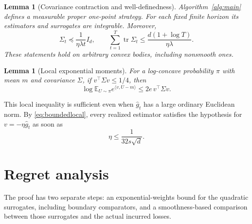 \documentclass[11pt]{article}
\numberwithin{equation}{section}
\newcommand{\E}{\mathbb E}
\newcommand{\tr}{\operatorname{tr}}
\newcommand{\ip}[2]{\langle #1,#2\rangle}
\newtheorem{lemma}[theorem]{Lemma}
\theoremstyle{definition}
\theoremstyle{remark}
\begin{document}
\begin{lemma}[Covariance contraction and well-definedness]\label{lem:state}
Algorithm~\ref{alg:main} defines a measurable proper one-point strategy.
For each fixed finite horizon its estimators and surrogates are integrable.
Moreover,
\begin{equation}\label{eq:covcontraction}
 \Sigma_t\preceq\frac1{\eta\lambda t}I_d,
 \qquad \sum_{t=1}^T\tr\Sigma_t
       \leq\frac{d(1+\log T)}{\eta\lambda}.
\end{equation}
These statements hold on arbitrary convex bodies, including nonsmooth ones.
\end{lemma}

\begin{lemma}[Local exponential moments]\label{lem:mgf}
For a log-concave probability $\pi$ with mean $m$ and covariance $\Sigma$, if
$v^\top\Sigma v\leq1/4$, then
\begin{equation}\label{eq:mgfexplicit}
 \log\E_{U\sim\pi} e^{\ip v{U-m}}\leq2e\,v^\top\Sigma v.
\end{equation}
\end{lemma}

This local inequality is sufficient even when $\widehat g_t$ has a large
ordinary Euclidean norm. By \eqref{eq:boundedlocal}, every realized estimator
satisfies the hypothesis for $v=-\eta\widehat g_t$ as soon as
\begin{equation}\label{eq:etarestriction}
 \eta\leq\frac1{32s\sqrt d}.
\end{equation}

\section{Regret analysis}\label{sec:analysis}
The proof has two separate steps: an exponential-weights bound for the quadratic
surrogates, including boundary comparators, and a smoothness-based comparison
between those surrogates and the actual incurred losses.
\end{document}
